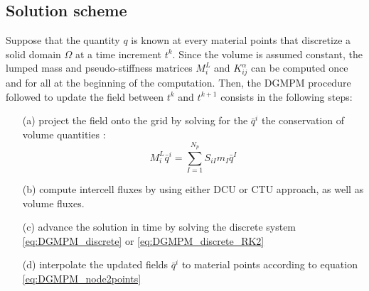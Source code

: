 \subsection{Solution scheme}
Suppose that the quantity $q$ is known at every material points that discretize a solid domain $\Omega$ at a time increment $t^k $.
Since the volume is assumed constant, the lumped mass and pseudo-stiffness matrices $M_{i}^L$ and $K_{ij}^\alpha$ can be computed once and for all at the beginning of the computation.
Then, the DGMPM procedure followed to update the field between $t^k$ and $t^{k+1}$ consists in the following steps:
\begin{itemize}
\item[(a)] project the field onto the grid by solving for the $\bar{q}^i$ the conservation of volume quantities \cite{DGMPM}:
  \begin{equation}
    \label{eq:DGMPM_points2nodes}
    M^L_i \bar{q}^i = \sum_{I=1}^{N_p} S_{iI} m_I \bar{q}^I 
  \end{equation}
\item[(b)] compute intercell fluxes by using either DCU or CTU approach, as well as volume fluxes.
\item[(c)] advance the solution in time by solving the discrete system \eqref{eq:DGMPM_discrete} or \eqref{eq:DGMPM_discrete_RK2}
\item[(d)] interpolate the updated fields $\bar{q}^i$ to material points according to equation \eqref{eq:DGMPM_node2points}
\end{itemize}

